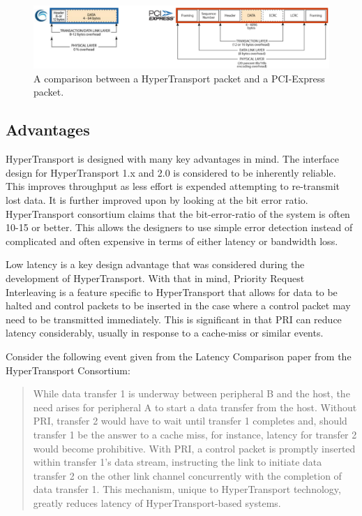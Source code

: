 \documentclass[conference]{IEEEtran}
\begin{document}
\begin{figure}[!t]
	\begin{center}
		\includegraphics[scale=.2]{htPacket}
	\end{center}
	\caption{A comparison between a HyperTransport packet and a PCI-Express
	packet.\cite{holden2006latency}}
\end{figure}
 
\subsection{Advantages}
\label{subsec:ht:advant}
HyperTransport is designed with many key advantages in mind. The interface
design for HyperTransport 1.x and 2.0 is considered to be inherently reliable.
This improves throughput as less effort is expended attempting to re-transmit
lost data. It is further improved upon by looking at the bit error ratio.
HyperTransport consortium claims that the bit-error-ratio of the system is
often 10-15 or better.\cite{holden2006latency} This allows the designers to use
simple error detection instead of complicated and often expensive in terms of either latency or
bandwidth loss. 

Low latency is a key design advantage that was considered during the development
of HyperTransport. With that in mind, Priority Request Interleaving is a feature
specific to HyperTransport that allows for data to be halted and control packets
to be inserted in the case where a control packet may need to be transmitted
immediately. This is significant in that PRI can reduce latency considerably,
usually in response to a cache-miss or similar events\cite{holden2006latency}.

Consider the following event given from the Latency Comparison paper from
the HyperTransport Consortium:

\bigskip

\begin{quote}
While data transfer 1 is underway between peripheral B and the
host, the need arises for peripheral A to start a data transfer from the host. Without PRI, transfer 2 would have to wait
until transfer 1 completes and, should transfer 1 be the answer to a cache miss, for instance,
latency for transfer 2 would become prohibitive. With PRI, a control packet is promptly
inserted within transfer 1's data stream, instructing the link to initiate data transfer 2 on the
other link channel concurrently with the completion of data transfer 1. This mechanism,
unique to HyperTransport technology, greatly reduces latency of HyperTransport-based
systems.\cite{holden2006latency}
\end{quote}
\end{document}

